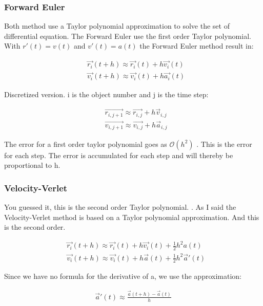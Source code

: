 \subsubsection{Forward Euler}

Both method use a Taylor polynomial approximation to solve the set of differential equation. The Forward Euler use the first order Taylor polynomial. With $r'(t) = v(t)$ and $v'(t) = a(t)$ the Forward Euler method result in: 
 
\begin{align}
	&\vec{r_i}(t+h) \approx \vec{r_i}(t) + h \vec{v_i}(t)
	\\
	&\vec{v_i}(t+h) \approx \vec{v_i}(t) + h \vec{a_i}(t)
\end{align}

Discretized version. i is the object number and j is the time step:

\begin{align*}
	&\vec{r_{i,j+1}} \approx \vec{r_{i,j}} + h \vec{v}_{i,j}
	\\
	&\vec{v_{i,j+1}} \approx \vec{v_{i,j}} + h \vec{a}_{i,j}
\end{align*}

The error for a first order taylor polynomial goes as $\mathcal{O}(h^2)$ . This is the error for each step. The error is accumulated for each step and will thereby be proportional to h. 

\subsubsection{Velocity-Verlet}

You guessed it, this is the second order Taylor polynomial. . As I said the Velocity-Verlet method is based on a Taylor polynomial approximation. And this is the second order. 

\begin{align}
	&\vec{r_i}(t+h) \approx \vec{r_i}(t) + h \vec{v_i}(t) + \frac{1}{2} h^2 a(t)
	\\
	&\vec{v_i}(t+h) \approx \vec{v_i}(t) + h \vec{a}(t) + \frac{1}{2} h^2 \vec{a}'(t)
	\label{eq:verlet}
\end{align}

Since we have no formula for the derivative of a, we use the approximation: 

\begin{align*}
	\vec{a}'(t) \approx \frac{\vec{a}(t+h) - \vec{a}(t)}{h}
\end{align*}

